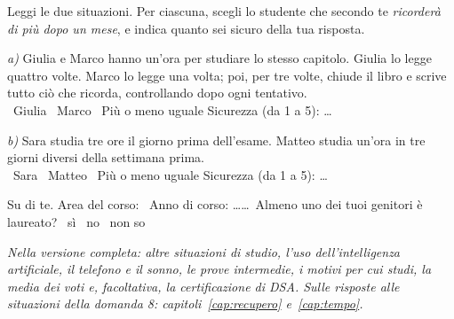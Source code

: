 { Leggi le due situazioni. Per ciascuna, scegli lo studente
che secondo te \emph{ricorderà di più dopo un mese}, e indica quanto sei
sicuro della tua risposta.

\emph{a)} Giulia e Marco hanno un'ora per studiare lo stesso capitolo.
Giulia lo legge quattro volte. Marco lo legge una volta; poi, per tre
volte, chiude il libro e scrive tutto ciò che ricorda, controllando dopo
ogni tentativo.\\
\quadretto\ Giulia \quad \quadretto\ Marco \quad \quadretto\ Più o meno
uguale \hfill Sicurezza (da 1 a 5): \ldots

\emph{b)} Sara studia tre ore il giorno prima dell'esame. Matteo studia
un'ora in tre giorni diversi della settimana prima.\\
\quadretto\ Sara \quad \quadretto\ Matteo \quad \quadretto\ Più o meno
uguale \hfill Sicurezza (da 1 a 5): \ldots

 Su di te. Area del corso: \dotfill\ Anno di corso:
\ldots\ldots\ Almeno uno dei tuoi genitori è laureato? \quadretto\ sì
\quadretto\ no \quadretto\ non so

\medskip
\noindent\emph{Nella versione completa: altre situazioni di studio,
l'uso dell'intelligenza artificiale, il telefono e il sonno, le prove
intermedie, i motivi per cui studi, la media dei voti e, facoltativa,
la certificazione di DSA. Sulle risposte alle situazioni della domanda
8: capitoli~\ref{cap:recupero} e~\ref{cap:tempo}.}
\par}

\finecapitolo
